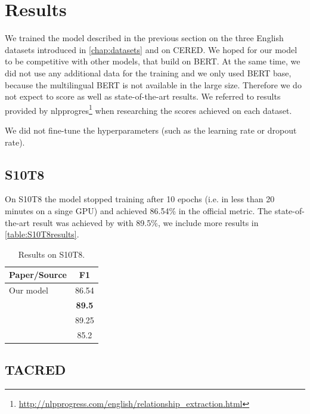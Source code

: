 \section{Results}

We trained the model described in the previous section on the three English datasets introduced in \autoref{chap:datasets} and on CERED. We hoped for our model to be competitive with other models, that build on BERT. At the same time, we did not use any additional data for the training and we only used BERT base, because the multilingual BERT is not available in the large size. Therefore we do not expect to score as well as state-of-the-art results. We referred to results provided by nlpprogres\footnote{\url{http://nlpprogress.com/english/relationship_extraction.html}} when researching the scores achieved on each dataset.

We did not fine-tune the hyperparameters (such as the learning rate or dropout rate). 


\subsection{S10T8}

On S10T8 the model stopped training after 10 epochs (i.e. in less than 20 minutes on a singe GPU) and achieved  86.54\% in the official metric. The state-of-the-art result was achieved by \cite{baldini-soares-etal-2019-matching} with 89.5\%, we include more results in \autoref{table:S10T8results}.


\begin{table}[h]
\centering
\caption{Results on S10T8.}
\label{table:S10T8results}
\begin{tabular}{l c }
\hline
Paper/Source & F1 \\
\hline
\hline
Our model & 86.54 \\
\textbf{\cite{baldini-soares-etal-2019-matching}} & \textbf{89.5} \\
\textit{\cite{DBLP:journals/corr/abs-1905-08284}} & 89.25 \\
\textit{\cite{DBLP:journals/corr/abs-1901-08163}} & 85.2 \\
\hline

\end{tabular}
\end{table}


\subsection{TACRED}

